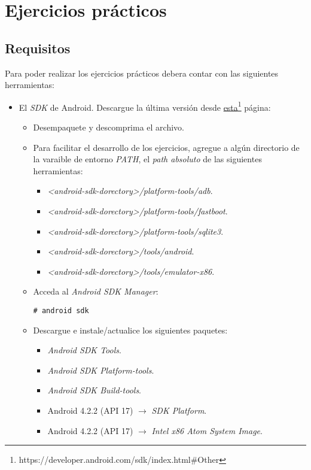 \section{Ejercicios prácticos}

\subsection{Requisitos}
Para poder realizar los ejercicios prácticos debera contar con las siguientes herramientas:
\begin{itemize}
 \item El \textit{SDK} de Android. Descargue la última versión desde \href{https://developer.android.com/sdk/index.html\#Other}{esta}\footnote{https://developer.android.com/sdk/index.html\#Other} página:
 \begin{itemize}
      \item Desempaquete y descomprima el archivo. 
      
      \item Para facilitar el desarrollo de los ejercicios, agregue a algún directorio de la varaible de entorno \textit{PATH}, el \textit{path absoluto} de las siguientes herramientas:
      \begin{itemize}
	\item \textit{<android-sdk-dorectory>/platform-tools/adb}.
	\item \textit{<android-sdk-dorectory>/platform-tools/fastboot}.
	\item \textit{<android-sdk-dorectory>/platform-tools/sqlite3}.
	\item \textit{<android-sdk-dorectory>/tools/android}.
	\item \textit{<android-sdk-dorectory>/tools/emulator-x86}.
      \end{itemize}
      
      \item Acceda al \textit{Android SDK Manager}:
      \begin{lstlisting}
# android sdk
      \end{lstlisting}
     
      \item Descargue e instale/actualice los siguientes paquetes:
      \begin{itemize}
	\item \textit{Android SDK Tools}.
	\item \textit{Android SDK Platform-tools}.
	\item \textit{Android SDK Build-tools}.
	\item Android 4.2.2 (API 17) $\rightarrow$ \textit{SDK Platform}.
	\item Android 4.2.2 (API 17) $\rightarrow$ \textit{Intel x86 Atom System Image}.
      \end{itemize}
 \end{itemize}
 

\end{itemize}
